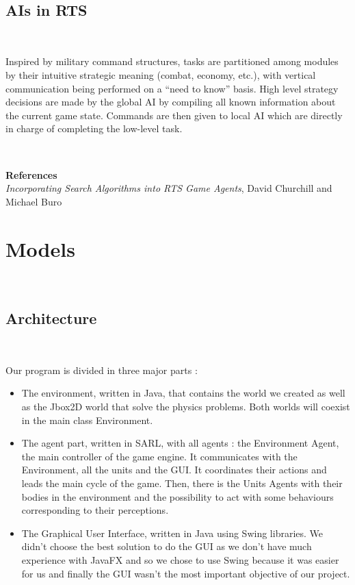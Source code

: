 \documentclass[a4paper,10pt]{book}
\begin{document}
~

\subsection{AIs in RTS}

~

Inspired by  military command structures,  tasks are partitioned among modules
by their intuitive strategic meaning (combat, economy, etc.),
with vertical communication being performed on a “need to
know” basis.  High level strategy decisions are made by the
global AI by compiling all known information about
the current game state.  Commands are then given to local AI
which are directly in charge of completing the low-level task.

~

\textbf{References} 
\textit{\\Incorporating Search Algorithms into RTS Game Agents},
David Churchill and Michael Buro

\section {Models}

~

\subsection{Architecture}

~

Our program is divided in three major parts :
\begin{itemize}
 \item The environment, written in Java, that contains the world we created as well as the Jbox2D world that solve the physics
 problems. Both worlds will coexist in the main class Environment.
 \item The agent part, written in SARL, with all agents : the Environment Agent, the main controller of the game engine. It
 communicates with the Environment, all the units and the GUI. It coordinates their actions and leads the main cycle of the game.
 Then, there is the Units Agents with their bodies in the environment and the possibility to act with some behaviours corresponding to
 their perceptions.
 \item The Graphical User Interface, written in Java using Swing libraries. We didn't choose the best solution to do the GUI as
 we don't have much experience with JavaFX and so we chose to use Swing because it was easier for us and finally the GUI wasn't the most
 important objective of our project.
\end{itemize}
\end{document}
